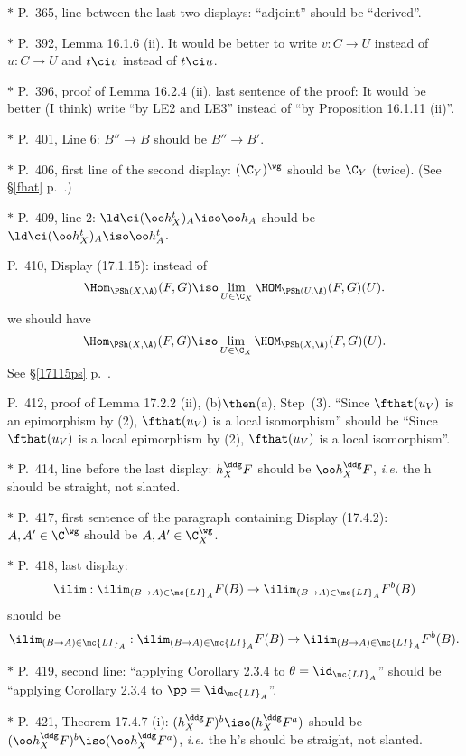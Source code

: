 \documentclass[12pt]{article}
\theoremstyle{remark}
\theoremstyle{definition}
\begin{document}
\nn$*$ P.~365, line between the last two displays: ``adjoint'' should be ``derived''.

\nn$*$ P.~392, Lemma 16.1.6 (ii). It would be better to write $v:C\to U$ instead of $u:C\to U$ and $t\ci v$ instead of $t\ci u$.

\nn$*$ P.~396, proof of Lemma 16.2.4 (ii), last sentence of the proof: It would be better (I think) write ``by LE2 and LE3'' instead of ``by Proposition 16.1.11 (ii)''.

\nn$*$ P.~401, Line 6: $B''\to B$ should be $B''\to B'$.

\nn$*$ P.~406, first line of the second display: $(\C_Y)^\wg$ should be $\C_Y$ (twice). (See \S\ref{fhat} p.~.)

\nn$*$ P.~409, line 2: $\ld\ci(\oo h_X^t)_A\iso\oo h_A$ should be $\ld\ci(\oo h_X^t)_A\iso\oo h_A^t$. 

\begin{s}
P.~410, Display (17.1.15): instead of 
$$
\Hom_{\PSh(X,\A)}(F,G)\iso\lim_{U\in\C_X}\HOM_{\PSh(U,\A)}(F,G)(U).
$$
we should have
$$
\Hom_{\PSh(X,\A)}(F,G)\iso\lim_{U\in\C_X}\HOM_{\PSh(X,\A)}(F,G)(U).
$$ 
See \S\ref{17115ps} p.~. 
\end{s}

%

\begin{s}
P.~412, proof of Lemma 17.2.2 (ii), (b)$\then$(a), Step~(3). ``Since $\fthat(u_V)$ is an epimorphism by (2), $\fthat(u_V)$ is a local isomorphism'' should be ``Since $\fthat(u_V)$ is a local epimorphism by (2), $\fthat(u_V)$ is a local isomorphism''.
\end{s}

\nn$*$ P.~414, line before the last display: $h_X^\ddg F$ should be $\oo h_X^\ddg F$, \emph{i.e.} the h should be straight, not slanted. 

\nn$*$ P.~417, first sentence of the paragraph containing Display (17.4.2): $A,A'\in\C^\wg$ should be $A,A'\in\C_X^\wg$. 

\nn$*$ P.~418, last display: 
$$
\ilim:\ilim_{(B\to A)\in\mc{LI}_A}F(B)\to\ilim_{(B\to A)\in\mc{LI}_A}F^b(B)
$$ 
should be 
$$
\ilim_{(B\to A)\in\mc{LI}_A}:\ilim_{(B\to A)\in\mc{LI}_A}F(B)\to\ilim_{(B\to A)\in\mc{LI}_A}F^b(B).
$$

\nn$*$ P.~419, second line: ``applying Corollary 2.3.4 to $\theta=\id_{\mc{LI}_A}$'' should be ``applying Corollary 2.3.4 to $\pp=\id_{\mc{LI}_A}$''.

\nn$*$ P.~421, Theorem 17.4.7 (i): $(h_X^\ddg F)^b\iso(h_X^\ddg F^a)$ should be $(\oo h_X^\ddg F)^b\iso(\oo h_X^\ddg F^a)$, \emph{i.e.} the h's should be straight, not slanted.
\end{document}
